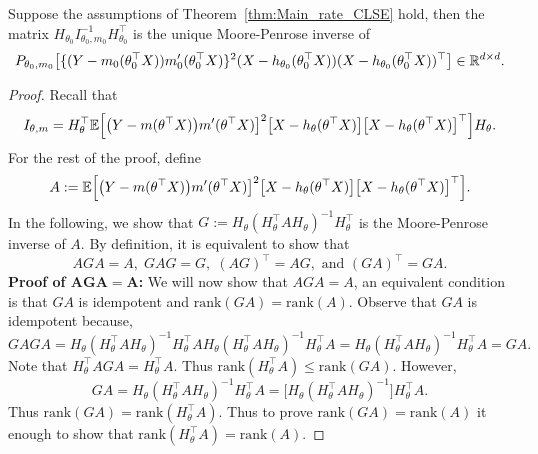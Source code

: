  \begin{lemma}\label{lem:UniqueInverse}
  Suppose the assumptions of Theorem~\ref{thm:Main_rate_CLSE} hold, then the matrix $H_{\theta_0}{I}^{-1}_{\theta_0,m_0} H_{\theta_0}^\top$ is the unique Moore-Penrose inverse of
 \begin{equation}\label{eq:True_inf}
 P_{\theta_0, m_0} \big[\{(Y-m_0(\theta_0^\top X))m'_0(\theta_0^\top X)\}^2 (X-h_{\theta_0}(\theta_0^\top X))(X-h_{\theta_0}(\theta_0^\top X))^\top \big] \in \mathbb{R}^{d\times d}.
 \end{equation}
 \end{lemma}

\begin{proof}
Recall that 
\begin{equation}\label{eq:I_def}
{I}_{\theta,m} = H_\theta^\top \mathbb{E}\Big[\big(Y-m(\theta^\top X)\big) m^\prime(\theta^\top X)\big]^2   \big[ X - h_\theta(\theta^\top X)\big]  \big[ X - h_\theta(\theta^\top X)\big]^\top\Big] H_\theta.
\end{equation}
For the rest of the proof, define
\begin{equation}\label{eq:A_def}
A:=\mathbb{E}\Big[\big(Y-m(\theta^\top X)\big) m^\prime(\theta^\top X)\big]^2   \big[ X - h_\theta(\theta^\top X)\big]  \big[ X - h_\theta(\theta^\top X)\big]^\top\Big].
\end{equation}
In the following, we show that $G:= H_\theta(H_\theta^\top {A} H_\theta)^{-1} H_\theta^\top$ is the Moore-Penrose inverse of ${A}.$ By definition, it is equivalent to show that 
\begin{equation}\label{eq:prop}
 AGA=A,\;  GAG=G,\; (AG)^\top= AG,\text{ and } (GA)^\top= GA.
 \end{equation} 
\textbf{Proof of $\mathbf{AGA=A}$:} We will now show that $A G A= A$, an equivalent condition is that  $G A$ is idempotent and $\text{rank}(GA) = \text{rank}(A)$. Observe that $GA$ is idempotent because,
\begin{equation}\label{eq:idem_GA}
 GAGA = H_\theta(H_\theta^\top {A} H_\theta)^{-1} H_\theta^\top A H_\theta(H_\theta^\top {A} H_\theta)^{-1} H_\theta^\top A= H_\theta(H_\theta^\top {A} H_\theta)^{-1} H_\theta^\top A= GA.
\end{equation}
Note that $H_\theta^\top A G A= H_\theta^\top A.$ Thus $\text{rank}(H_\theta^\top A) \le \text{rank}(GA)$. However, 
\[ GA = H_\theta(H_\theta^\top {A} H_\theta)^{-1} H_\theta^\top A = \big[H_\theta(H_\theta^\top {A} H_\theta)^{-1}\big] H_\theta^\top A.\]
 Thus $\text{rank}(GA) = \text{rank}(H_\theta^\top A).$ Thus to prove $\text{rank}(GA) = \text{rank}(A)$ it enough to show that  $\text{rank}(H_\theta^\top A) = \text{rank}(A)$.

\end{proof}
